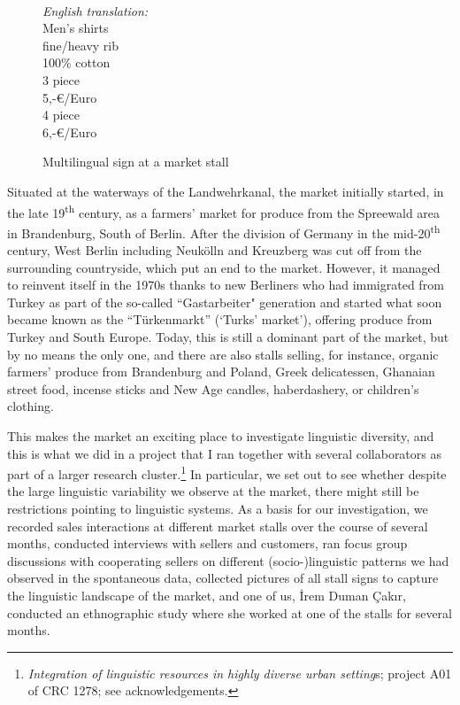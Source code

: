 \begin{figure}[H]
~~\parbox[b]{3cm}{\textit{English translation:}\\
                                                   \footnotesize Men's shirts\\[1.5em]
                                                   fine/heavy rib\\
                                                   100\% cotton\\[.33em]
                                                   3 piece\\
                                                   5,-€/Euro\\[.33em]
                                                   4 piece\\
                                                   6,-€/Euro} 
\caption{\label{fig:9} Multilingual sign at a market stall}
\end{figure}

Situated at the waterways of the Landwehrkanal, the market initially started, in the late 19\textsuperscript{th} century, as a farmers’ market for produce from the Spreewald area in Brandenburg, South of Berlin. After the division of Germany in the mid-20\textsuperscript{th} century, West Berlin including Neukölln and Kreuzberg was cut off from the surrounding countryside, which put an end to the market. However, it managed to reinvent itself in the 1970s thanks to new Berliners who had immigrated from Turkey as part of the so-called “Gastarbeiter" generation and started what soon became known as the “Türkenmarkt” (‘Turks’ market’), offering produce from Turkey and South Europe. Today, this is still a dominant part of the market, but by no means the only one, and there are also stalls selling, for instance, organic farmers’ produce from Brandenburg and Poland, Greek delicatessen, Ghanaian street food, incense sticks and New Age candles, haberdashery, or children’s clothing.

This makes the market an exciting place to investigate linguistic diversity, and this is what we did in a project that I ran together with several collaborators as part of a larger research cluster.\footnote{\textit{Integration of linguistic resources in highly diverse urban setting}s; project A01 of {CRC 1278}; see acknowledgements.} In particular, we set out to see whether despite the large linguistic variability we observe at the market, there might still be restrictions pointing to linguistic systems. As a basis for our investigation, we recorded sales interactions at different market stalls over the course of several months, conducted interviews with sellers and customers, ran focus group discussions with cooperating sellers on different (socio\nobreakdash-)linguistic patterns we had observed in the spontaneous data, collected pictures of all stall signs to capture the linguistic landscape of the market, and one of us, İrem Duman Çakır, conducted an ethnographic study where she worked at one of the stalls for several months.

